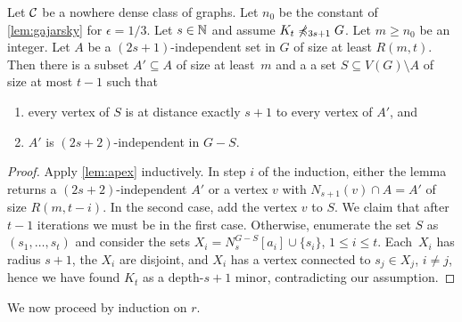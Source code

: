 \begin{lemma}\label{lem:iterate-apex}
Let $\mathcal{C}$ be a nowhere dense class of graphs. 
Let $n_0$ be the constant of \cref{lem:gajarsky} for $\epsilon=1/3$. 
Let $s\in \mathbb{N}$ and assume $K_t\not\preccurlyeq_{3s+1} G$. 
Let $m\geq n_0$ be an integer. 
Let $A$ be a $(2s+1)$-independent set in $G$ of size at least $R(m,t)$. 
Then there is a subset $A'\subseteq A$ of size at least~$m$ and a 
a set $S\subseteq V(G)\setminus A$ of size at most $t-1$ such that
\begin{enumerate}
\item every vertex of $S$ is at distance exactly $s+1$ to 
every vertex of $A'$, and
\item $A'$ is $(2s+2)$-independent in $G-S$. 
\end{enumerate} 
\end{lemma}
\begin{proof}
Apply \cref{lem:apex} inductively. In step $i$ of the induction,
either the lemma returns a $(2s+2)$-independent $A'$ or a vertex $v$
with $N_{s+1}(v)\cap A=A'$ of size $R(m,t-i)$. In the second
case, add the vertex $v$ to $S$. We claim that after $t-1$
iterations we must be in the first case. Otherwise, enumerate the set $S$ 
as $(s_1,\ldots, s_t)$ and consider the sets
$X_i=N_s^{G-S}[a_i]\cup \{s_i\}$, $1\leq i\leq t$. Each~$X_i$ has radius
$s+1$, the $X_i$ are disjoint, and $X_i$ has a vertex connected to $s_j\in X_j$, $i\neq j$, 
hence we have found $K_t$ as a depth-$s+1$ minor, contradicting
our assumption. 
\end{proof}

We now proceed by induction on $r$. 


